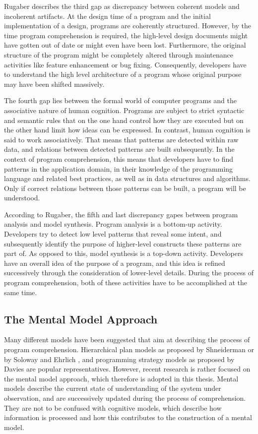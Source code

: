 Rugaber describes the third gap as discrepancy between coherent models and incoherent artifacts.
At the design time of a program and the initial implementation of a design, programs are coherently structured.
However, by the time program comprehension is required, the high-level design documents might have gotten out of date or might even have been lost.
Furthermore, the original structure of the program might be completely altered through maintenance activities like feature enhancement or bug fixing.
Consequently, developers have to understand the high level architecture of a program whose original purpose may have been shifted massively.

The fourth gap lies between the formal world of computer programs and the associative nature of human cognition.
Programs are subject to strict syntactic and semantic rules that on the one hand control how they are executed but on the other hand limit how ideas can be expressed.
In contrast, human cognition is said to work associatively.
That means that patterns are detected within raw data, and relations between detected patterns are built subsequently.
In the context of program comprehension, this means that developers have to find patterns in the application domain, in their knowledge of the programming language and related best practices, as well as in data structures and algorithms.
Only if correct relations between those patterns can be built, a program will be understood.

According to Rugaber, the fifth and last discrepancy gapes between program analysis and model synthesis.
Program analysis is a bottom-up activity.
Developers try to detect low level patterns that reveal some intent, and subsequently identify the purpose of higher-level constructs these patterns are part of.
As opposed to this, model synthesis is a top-down activity.
Developers have an overall idea of the purpose of a program, and this idea is refined successively through the consideration of lower-level details.
During the process of program comprehension, both of these activities have to be accomplished at the same time.

\subsection{The Mental Model Approach}
\label{ss:BackgroundComprehensionMentalModel}
Many different models have been suggested that aim at describing the process of program comprehension.
Hierarchical plan models as proposed by Shneiderman \cite{shneiderman_exploratory_1976} or by Soloway and Ehrlich \cite{soloway_empirical_1984}, and programming strategy models as proposed by Davies \cite{davies_role_1991} are popular representatives.
However, recent research is rather focused on the mental model approach, which therefore is adopted in this thesis.
Mental models describe the current state of understanding of the system under observation, and are successively updated during the process of comprehension.
They are not to be confused with cognitive models, which describe how information is processed and how this contributes to the construction of a mental model.

